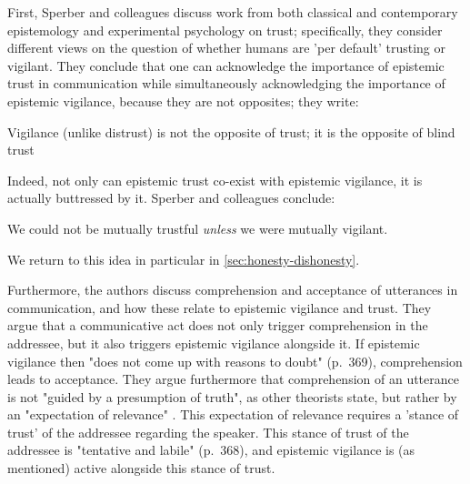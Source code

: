First, Sperber and colleagues discuss work from both classical and contemporary epistemology and experimental psychology on trust; specifically, they consider different views on the question of whether humans are 'per default' trusting or vigilant. They conclude that one can acknowledge the importance of epistemic trust in communication while simultaneously acknowledging the importance of epistemic vigilance, because they are not opposites; they write:
\begin{quoting}
    Vigilance (unlike distrust) is not the opposite of trust; it is the opposite
of blind trust
  \hfill \citep[p.~363]{Sperber10}
\end{quoting}
Indeed, not only can epistemic trust co-exist with epistemic vigilance, it is actually buttressed by it. Sperber and colleagues conclude:
\begin{quoting}
    We could not be mutually trustful \emph{unless} we were mutually vigilant.
    \hfill \citep[p.~364]{Sperber10}
\end{quoting}
We return to this idea in particular in \cref{sec:honesty-dishonesty}.

Furthermore, the authors discuss comprehension and acceptance of utterances in communication, and how these relate to epistemic vigilance and trust.
They argue that a communicative act does not only trigger comprehension in the addressee, but it also triggers epistemic vigilance alongside it. If epistemic vigilance then "does not come up with reasons to doubt" (p.~369), comprehension leads to acceptance.
They argue furthermore that comprehension of an utterance is not "guided by a presumption of truth", as other theorists state, but rather by an "expectation of relevance" \citep[p.~367; see][]{SperberWilson86}. This expectation of relevance requires a 'stance of trust' of the addressee regarding the speaker.
This stance of trust of the addressee is "tentative and labile" (p.~368), and epistemic vigilance is (as mentioned) active alongside this stance of trust.


